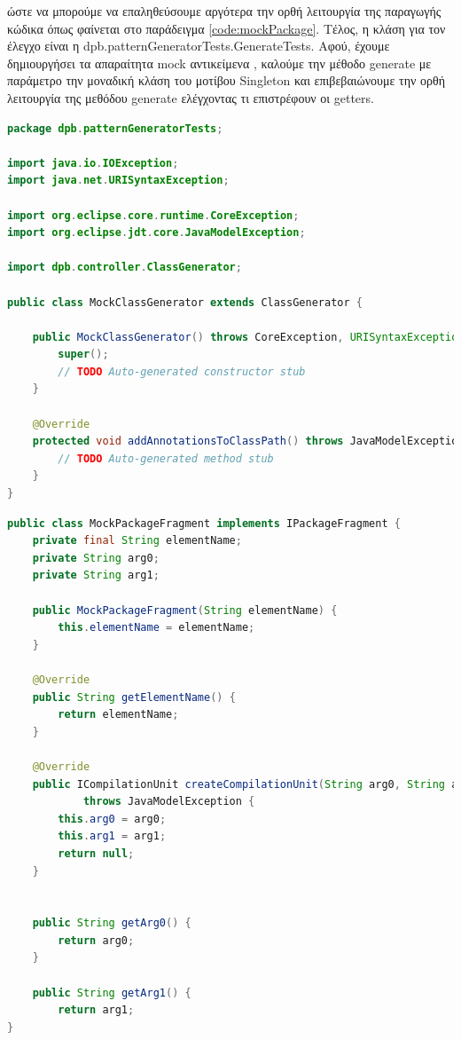 ώστε να μπορούμε να επαληθεύσουμε αργότερα την ορθή λειτουργία της παραγωγής κώδικα όπως φαίνεται στο παράδειγμα 
\ref{code:mockPackage}. Τέλος, η κλάση για τον έλεγχο είναι η dpb.patternGeneratorTests.GenerateTests. 
Αφού, έχουμε δημιουργήσει τα απαραίτητα mock αντικείμενα \cite{SWEBOK}, 
καλούμε την μέθοδο generate με παράμετρο την μοναδική κλάση του μοτίβου Singleton και επιβεβαιώνουμε 
την ορθή λειτουργία της μεθόδου generate ελέγχοντας τι επιστρέφουν οι getters.
\newpage
\begin{lstlisting}[label=code:ClassGenerator, caption=Mock κλάση για την κλάση ClassGenerator, language=java]
package dpb.patternGeneratorTests;

import java.io.IOException;
import java.net.URISyntaxException;

import org.eclipse.core.runtime.CoreException;
import org.eclipse.jdt.core.JavaModelException;

import dpb.controller.ClassGenerator;

public class MockClassGenerator extends ClassGenerator {

    public MockClassGenerator() throws CoreException, URISyntaxException, IOException {
        super();
        // TODO Auto-generated constructor stub
    }

    @Override
    protected void addAnnotationsToClassPath() throws JavaModelException, URISyntaxException, IOException {
        // TODO Auto-generated method stub
    }
}
\end{lstlisting}
\newpage
\begin{lstlisting}[label=code:mockPackage, caption=Mock κλάση για την κλάση PackageFragment, language=java]
public class MockPackageFragment implements IPackageFragment {
    private final String elementName;
    private String arg0;
    private String arg1;
            
    public MockPackageFragment(String elementName) {
        this.elementName = elementName;
    }

    @Override
    public String getElementName() {
        return elementName;
    }

    @Override
    public ICompilationUnit createCompilationUnit(String arg0, String arg1, boolean arg2, IProgressMonitor arg3)
            throws JavaModelException {
        this.arg0 = arg0;
        this.arg1 = arg1;
        return null;
    }


    public String getArg0() {
        return arg0;
    }

    public String getArg1() {
        return arg1;
}
\end{lstlisting}
    


